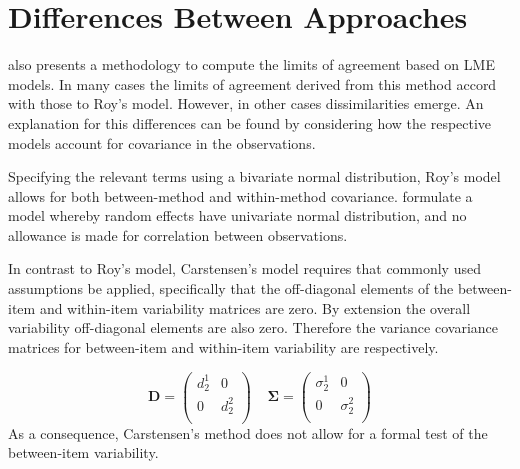 \documentclass[12pt, a4paper]{report}
\theoremstyle{plain}
\theoremstyle{definition}
\theoremstyle{remark}
\begin{document}
 \section{Differences Between Approaches}
 
 \citet{BXC2008} also presents a methodology to compute the limits of agreement based on LME models. In many cases the limits of agreement derived from this method accord with those to Roy's model. However, in other cases dissimilarities emerge. An explanation for this differences can be found by considering how the respective models account for covariance in the observations. 
 
 Specifying the relevant terms using a bivariate normal distribution, Roy's model allows for both between-method and within-method covariance. \citet{BXC2008} formulate a model whereby random effects have univariate normal distribution, and no allowance is made for correlation between observations.
 
 In contrast to Roy's model, Carstensen's model requires that commonly used assumptions be applied, specifically that the off-diagonal elements of the between-item and within-item variability matrices are zero. By
 extension the overall variability off-diagonal elements are also zero. Therefore the variance covariance matrices for
 between-item and within-item variability are respectively.
 
 \[\boldsymbol{D} = \left(
 \begin{array}{cc}
 d^1_2  & 0 \\
 0 & d^2_2 \\
 \end{array}
 \right) \;\;\;\; \boldsymbol{\Sigma} = \left(
 \begin{array}{cc}
 \sigma^1_2  & 0 \\
 0 & \sigma^2_2 \\
 \end{array}
 \right) \]
 As a consequence, Carstensen's method does not allow for a formal test of the between-item variability.
 
 
 
\end{document}
